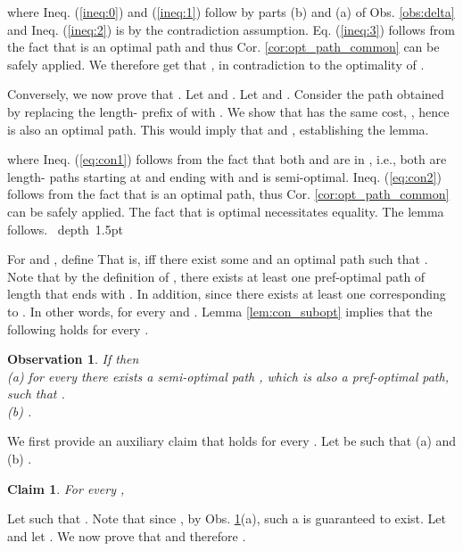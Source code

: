 \documentclass[12pt]{article}
\newtheorem{observation}[theorem]{Observation}
\newtheorem{claim}{Claim}[section]
\def\Proof{\par\noindent{\bf Proof:~}}
\def\blackslug{\hbox{\hskip 1pt \vrule width 4pt height 8pt
    depth 1.5pt \hskip 1pt}}
\def\QED{\quad\blackslug\lower 8.5pt\null\par}
\begin{document}
where Ineq. (\ref{ineq:0}) and (\ref{ineq:1}) follow by parts (b) and (a) of Obs. \ref{obs:delta} and Ineq. (\ref{ineq:2}) is by the contradiction assumption. Eq. (\ref{ineq:3}) follows from the fact that  is an optimal  path and thus Cor. \ref{cor:opt_path_common} can be safely applied.
We therefore get that , in contradiction to the optimality of .
\par Conversely, we now prove that .
Let  and . Let  and . Consider the path  obtained by replacing the length- prefix of  with . We show that  has the same cost, , hence  is also an optimal   path. This would imply that  and , establishing the lemma.

where Ineq. (\ref{eq:con1}) follows from the fact that both  and  are in , i.e., both are length- paths starting at  and ending with  and  is semi-optimal. Ineq. (\ref{eq:con2}) follows from the fact that  is an optimal  path, thus Cor. \ref{cor:opt_path_common} can be safely applied. The fact that  is optimal necessitates equality. The lemma follows.
\QED
For  and , define 
That is,  iff there exist some  and an optimal  path  such that .
Note that by the definition of , there exists at least one pref-optimal path  of length  that ends with . In addition, since  there exists at least one  corresponding to . In other words,  for every  and .
Lemma \ref{lem:con_subopt} implies that the following holds for every .
\begin{observation}
\label{cl:parent_opt}
If  then \\
(a) for every  there exists a semi-optimal path , which is also a pref-optimal path, such that .\\
(b) .
\end{observation}
We first provide an auxiliary claim that holds for every . Let  be such that (a)  and
(b) .
\begin{claim}
\label{cl:nn}
For every , 
\end{claim}
\Proof
Let  such that . Note that since , by Obs. \ref{cl:parent_opt}(a), such a  is guaranteed to exist. Let  and let .
We now prove that  and therefore .
\end{document}
